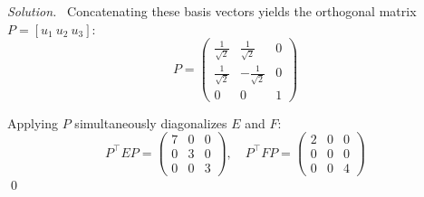 \documentclass[12pt,a4paper]{article}
\newenvironment{solution}{%
  \par\noindent\textit{Solution.}\ }{\qed}
\theoremstyle{problemstyle}
\begin{document}
\begin{solution}
Concatenating these basis vectors yields the orthogonal matrix \( P = [u_1 \ u_2 \ u_3] \):
\[ P = \begin{pmatrix} \frac{1}{\sqrt{2}} & \frac{1}{\sqrt{2}} & 0 \\ \frac{1}{\sqrt{2}} & -\frac{1}{\sqrt{2}} & 0 \\ 0 & 0 & 1 \end{pmatrix} \]

Applying \( P \) simultaneously diagonalizes \( E \) and \( F \):
\[ P^\top EP = \begin{pmatrix} 7 & 0 & 0 \\ 0 & 3 & 0 \\ 0 & 0 & 3 \end{pmatrix}, \quad P^\top FP = \begin{pmatrix} 2 & 0 & 0 \\ 0 & 0 & 0 \\ 0 & 0 & 4 \end{pmatrix} \]
\end{solution}
\end{document}
